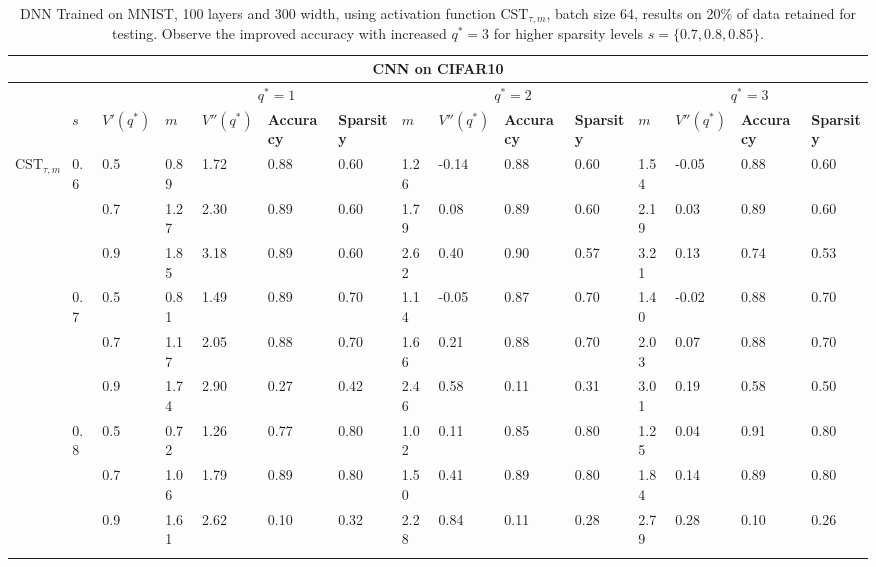 \documentclass{article}
\theoremstyle{plain}
\theoremstyle{definition}
\theoremstyle{remark}
\begin{document}
\begin{table}[htbp!]
\centering
\tiny
\caption{DNN Trained on MNIST, 100 layers and 300 width, using activation function $\text{CST}_{\tau, m}$, batch size 64, results on 20\% of data retained for testing. Observe the improved accuracy with increased $q^*=3$ for higher sparsity levels $s=\{ 0.7, 0.8, 0.85\}$.}

\begin{tabular}
{p{0.8cm}p{0.3cm}p{0.6cm}|p{0.35cm}p{0.65cm}|p{0.5cm}p{0.6cm}|p{0.35cm}p{0.65cm}|p{0.5cm}p{0.6cm}|p{0.35cm}p{0.65cm}|p{0.5cm}p{0.6cm}}
\toprule
\multicolumn{15}{c}{\textbf{CNN on CIFAR10}} \\ 
\midrule
 &   & & \multicolumn{4}{|c|}{$q^*=1$} & \multicolumn{4}{|c|}{$q^*=2$} & \multicolumn{4}{|c}{$q^*=3$} \\
\midrule
  & $s$ & $V'(q^*)$  & 
 $m$ & $V''(q^*)$  &\textbf{Accuracy} & \textbf{Sparsity} & $m$ & $V''(q^*)$ &\textbf{Accuracy} & \textbf{Sparsity} & $m$ & $V''(q^*)$ &\textbf{Accuracy} & \textbf{Sparsity} \\ 
\midrule
\multirow{12}{*}{$\text{CST}_{\tau, m}$} 
& 0.6& 0.5 & 0.89 & 1.72 & 0.88 & 0.60 & 1.26 & -0.14 & 0.88 & 0.60 & 1.54 & -0.05 & 0.88 & 0.60 \\
\rowcolor{lightgray}\cellcolor{white}&\cellcolor{white}&     0.7 & 1.27 & 2.30 & 0.89 & 0.60 & 1.79 &  0.08 & 0.89 & 0.60 &  2.19 &  0.03 & 0.89 & 0.60 \\
&&     0.9 & 1.85 & 3.18 & 0.89 & 0.60 & 2.62 &  0.40 & 0.90 & 0.57 &  3.21 &  0.13 & 0.74 & 0.53 \\
\cline{2-15}
& 0.7 & 0.5 & 0.81 & 1.49 & 0.89 & 0.70 & 1.14 & -0.05 & 0.87 & 0.70 & 1.40 & -0.02 & 0.88 & 0.70 \\
\rowcolor{lightgray}\cellcolor{white}&\cellcolor{white}&   0.7 & 1.17 & 2.05 & 0.88 & 0.70 & 1.66 &  0.21 & 0.88 & 0.70 &  2.03 &  0.07 & 0.88 & 0.70 \\
&&   0.9 & 1.74 & 2.90 & 0.27 & 0.42 & 2.46 &  0.58 & 0.11 & 0.31 &  3.01 &  0.19 & 0.58 & 0.50 \\
\cline{2-15}
& 0.8 & 0.5 & 0.72 & 1.26 & 0.77 & 0.80 & 1.02 &  0.11 & 0.85 & 0.80 &  1.25 &  0.04 & 0.91 & 0.80 \\
\rowcolor{lightgray}\cellcolor{white}&\cellcolor{white}&   0.7 & 1.06 & 1.79 & 0.89 & 0.80 & 1.50 &  0.41 & 0.89 & 0.80 &  1.84 &  0.14 & 0.89 & 0.80 \\
&&   0.9 & 1.61 & 2.62 & 0.10 & 0.32 & 2.28 &  0.84 & 0.11 & 0.28 &  2.79 &  0.28 & 0.10 & 0.26 \\
\cline{2-15}


\end{tabular}
\end{table}
\end{document}
